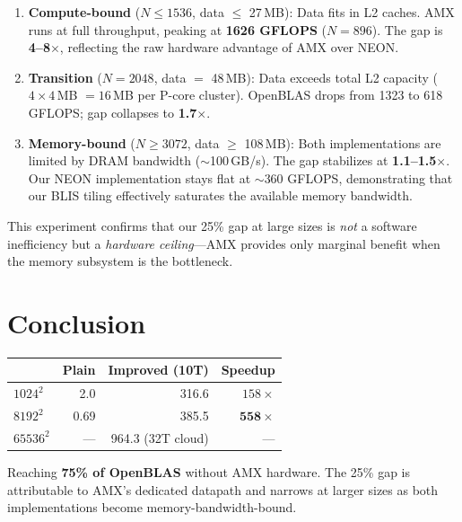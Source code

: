 \documentclass[11pt,a4paper]{article}
\begin{document}
\begin{enumerate}[nosep]
  \item \textbf{Compute-bound} ($N \le 1536$, data $\le$ 27\,MB):
    Data fits in L2 caches. AMX runs at full throughput,
    peaking at \textbf{1626 GFLOPS} ($N{=}896$).
    The gap is \textbf{4--8$\times$}, reflecting the raw hardware
    advantage of AMX over NEON.
  \item \textbf{Transition} ($N{=}2048$, data $=$ 48\,MB):
    Data exceeds total L2 capacity ($4 \times 4$\,MB $= 16$\,MB per P-core cluster).
    OpenBLAS drops from 1323 to 618 GFLOPS; gap collapses to \textbf{1.7$\times$}.
  \item \textbf{Memory-bound} ($N \ge 3072$, data $\ge$ 108\,MB):
    Both implementations are limited by DRAM bandwidth ($\sim$100\,GB/s).
    The gap stabilizes at \textbf{1.1--1.5$\times$}. Our NEON implementation
    stays flat at $\sim$360 GFLOPS, demonstrating that our BLIS tiling
    effectively saturates the available memory bandwidth.
\end{enumerate}

This experiment confirms that our 25\% gap at large sizes is \emph{not} a software
inefficiency but a \emph{hardware ceiling}---AMX provides only marginal benefit
when the memory subsystem is the bottleneck.


\section{Conclusion}

\begin{table}[H]\centering
\begin{tabular}{l|rrr}
\toprule & Plain & Improved (10T) & Speedup \\
\midrule $1024^2$ & 2.0 & 316.6 & $158\times$ \\
$8192^2$ & 0.69 & 385.5 & $\mathbf{558\times}$ \\
$65536^2$ & --- & 964.3 (32T cloud) & --- \\
\bottomrule
\end{tabular}
\end{table}

Reaching \textbf{75\% of OpenBLAS} without AMX hardware.
The 25\% gap is attributable to AMX's dedicated datapath and narrows at larger sizes
as both implementations become memory-bandwidth-bound.


\end{document}
